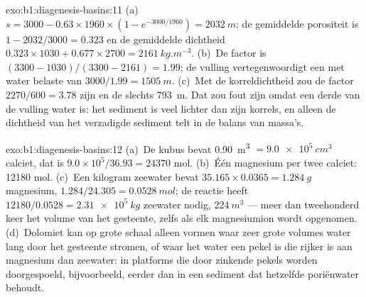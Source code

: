 \begin{solution}{exo:b1:diagenesis-basins:11}
(a)~$s = 3000 - 0.63\times1960\times(1 - e^{-3000/1960}) = \qty{2032}{m}$; de
gemiddelde porositeit is $1 - 2032/3000 = \num{0.323}$ en de gemiddelde dichtheid
$0.323\times1030 + 0.677\times2700 = \qty{2161}{kg.m^{-3}}$. (b)~De factor is
$(3300 - 1030)/(3300 - 2161) = \num{1.99}$; de vulling vertegenwoordigt een met water belaste
 van $3000/1.99 = \qty{1505}{m}$. (c)~Met de korreldichtheid zou de factor
$2270/600 = \num{3.78}$ zijn en de  slechts \qty{793}{m}. Dat zou fout zijn omdat
een derde van de vulling water is: het sediment is veel lichter dan
zijn korrels, en alleen de dichtheid van het verzadigde sediment telt in de balans van
massa's.
\end{solution}

\begin{solution}{exo:b1:diagenesis-basins:12}
(a)~De kubus bevat \qty{0.90}{m^3} $= \qty{9.0e5}{cm^3}$ calciet, dat is
$9.0\times10^5/36.93 = \num{24370}$ mol. (b)~Één magnesium per twee calciet:
\num{12180} mol. (c)~Een kilogram zeewater bevat $35.165\times0.0365 =
\qty{1.284}{g}$ magnesium, $1.284/24.305 = \qty{0.0528}{mol}$; de reactie
heeft $12180/0.0528 = \qty{2.31e5}{kg}$ zeewater nodig, $\qty{224}{m^3}$ --- meer
dan tweehonderd keer het volume van het gesteente, zelfs als elk magnesiumion wordt
opgenomen. (d)~Dolomiet kan op grote schaal alleen vormen waar zeer grote volumes
water lang door het gesteente stromen, of waar het water een pekel is die rijker is aan magnesium dan
zeewater: in platforms die door zinkende pekels worden doorgespoeld, bijvoorbeeld, eerder dan in een
sediment dat hetzelfde poriënwater behoudt.
\end{solution}

